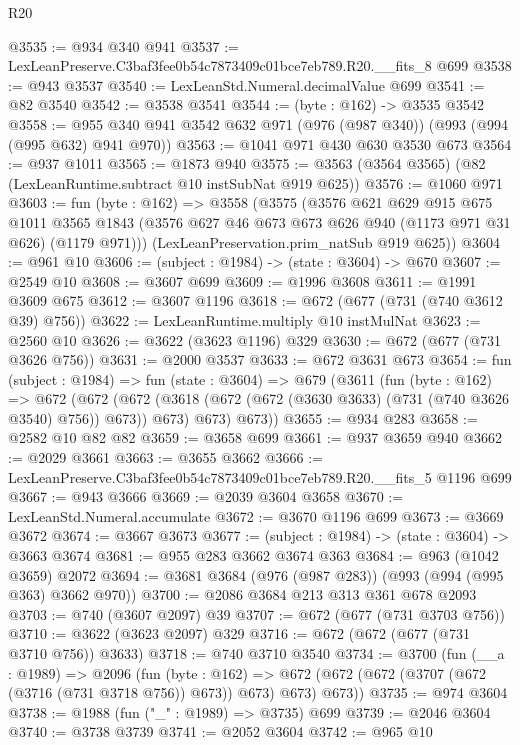 \begin{lexlean}{R20}
\begin{coremodule}
@3535 := @934 @340 @941
@3537 := LexLeanPreserve.C3baf3fee0b54c7873409c01bce7eb789.R20.__fits_8 @699
@3538 := @943 @3537
@3540 := LexLeanStd.Numeral.decimalValue @699
@3541 := @82 @3540
@3542 := @3538 @3541
@3544 := (byte : @162) -> @3535 @3542
@3558 := @955 @340 @941 @3542 @632 @971 (@976 (@987 @340)) (@993 (@994 (@995 @632) @941 @970))
@3563 := @1041 @971 @430 @630 @3530 @673
@3564 := @937 @1011
@3565 := @1873 @940
@3575 := @3563 (@3564 @3565) (@82 (LexLeanRuntime.subtract @10 instSubNat @919 @625))
@3576 := @1060 @971
@3603 := fun (byte : @162) =>
  @3558
    (@3575
      (@3576
        @621
        @629
        @915
        @675
        @1011
        @3565
        @1843
        (@3576 @627 @46 @673 @673 @626 @940 (@1173 @971 @31 @626) (@1179 @971)))
      (LexLeanPreservation.prim_natSub @919 @625))
@3604 := @961 @10
@3606 := (subject : @1984) -> (state : @3604) -> @670
@3607 := @2549 @10
@3608 := @3607 @699
@3609 := @1996 @3608
@3611 := @1991 @3609 @675
@3612 := @3607 @1196
@3618 := @672 (@677 (@731 (@740 @3612 @39) @756))
@3622 := LexLeanRuntime.multiply @10 instMulNat
@3623 := @2560 @10
@3626 := @3622 (@3623 @1196) @329
@3630 := @672 (@677 (@731 @3626 @756))
@3631 := @2000 @3537
@3633 := @672 @3631 @673
@3654 := fun (subject : @1984) =>
  fun (state : @3604) =>
  @679
    (@3611
      (fun (byte : @162) =>
      @672
        (@672
          (@672 (@3618 (@672 (@672 (@3630 @3633) (@731 (@740 @3626 @3540) @756)) @673)) @673)
          @673)
        @673))
@3655 := @934 @283
@3658 := @2582 @10 @82 @82
@3659 := @3658 @699
@3661 := @937 @3659 @940
@3662 := @2029 @3661
@3663 := @3655 @3662
@3666 := LexLeanPreserve.C3baf3fee0b54c7873409c01bce7eb789.R20.__fits_5 @1196 @699
@3667 := @943 @3666
@3669 := @2039 @3604 @3658
@3670 := LexLeanStd.Numeral.accumulate
@3672 := @3670 @1196 @699
@3673 := @3669 @3672
@3674 := @3667 @3673
@3677 := (subject : @1984) -> (state : @3604) -> @3663 @3674
@3681 := @955 @283 @3662 @3674 @363
@3684 := @963 (@1042 @3659) @2072
@3694 := @3681 @3684 (@976 (@987 @283)) (@993 (@994 (@995 @363) @3662 @970))
@3700 := @2086 @3684 @213 @313 @361 @678 @2093
@3703 := @740 (@3607 @2097) @39
@3707 := @672 (@677 (@731 @3703 @756))
@3710 := @3622 (@3623 @2097) @329
@3716 := @672 (@672 (@677 (@731 @3710 @756)) @3633)
@3718 := @740 @3710 @3540
@3734 := @3700
    (fun (__a : @1989) =>
    @2096
      (fun (byte : @162) =>
      @672 (@672 (@672 (@3707 (@672 (@3716 (@731 @3718 @756)) @673)) @673) @673) @673))
@3735 := @974 @3604
@3738 := @1988 (fun ("_" : @1989) => @3735) @699
@3739 := @2046 @3604
@3740 := @3738 @3739
@3741 := @2052 @3604
@3742 := @965 @10

\end{coremodule}
\end{lexlean}
